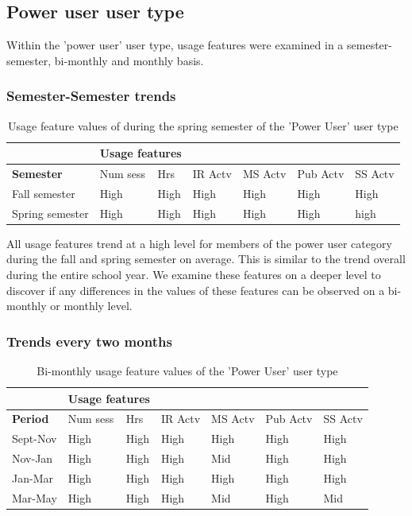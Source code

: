 \documentclass{acm_proc_article-sp}
\begin{document}
\subsection {Power user user type}
Within the 'power user' user type, usage features were examined in a semester-semester, bi-monthly and monthly basis.

\subsubsection{Semester-Semester trends}

\begin{table}
\caption{Usage feature values of during the spring semester of the 'Power User' user type}
\label{cluster1semester}
\begin{tabular}{|p{1.5cm}|p{0.6cm}|p{0.6cm}|p{0.6cm}|p{0.6cm}|p{0.8cm}|p{0.8cm}|}
& \multicolumn{2}{r}{\textbf{Usage features}}  \\ \hline
 \textbf{Semester} 
 & Num sess & Hrs & IR Actv & MS Actv & Pub Actv & SS Actv \\ \hline
Fall  semester & High & High  & High & High & High & High \\ \hline
Spring semester & High & High  & High & High & High & high \\ \hline
\end{tabular}
\end{table}

All usage features trend at a high level for members of the power user category during the fall and spring semester on average. This is similar to the trend overall during the entire school year. We examine these features on a deeper level to discover if any differences in the values of these features can be observed on a bi-monthly or monthly level.

\subsubsection{Trends every two months}
\begin{table}
\caption{Bi-monthly usage feature values of the 'Power User' user type}
\label{cluster1bimonthly}
\begin{tabular}{|p{1.5cm}|p{0.6cm}|p{0.6cm}|p{0.6cm}|p{0.6cm}|p{0.8cm}|p{0.8cm}|}
& \multicolumn{2}{r}{\textbf{Usage features}}  \\ \hline
 \textbf{Period} 
 & Num sess & Hrs & IR Actv & MS Actv & Pub Actv & SS Actv \\ \hline
Sept-Nov & High & High  & High & High & High & High \\ \hline
Nov-Jan & High & High  & High & Mid & High & High \\ \hline
Jan-Mar & High & High  & High & High & High & High \\ \hline
Mar-May & High & High  & High & Mid & High & Mid \\ \hline
\end{tabular}
\end{table}
\end{document}
